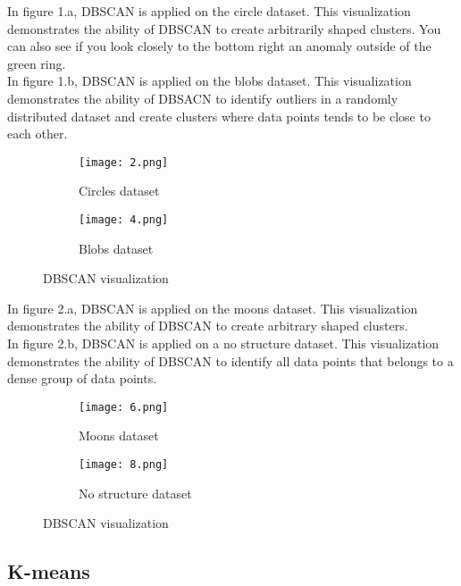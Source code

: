 \documentclass[a4paper]{article}
\begin{document}
In figure 1.a, DBSCAN is applied on the circle dataset. This visualization demonstrates the ability of DBSCAN to create arbitrarily shaped clusters. You can also see if you look closely to the bottom right an anomaly outside of the green ring.
\newline\\
In figure 1.b, DBSCAN is applied on the blobs dataset. This visualization demonstrates the ability of DBSACN to identify outliers in a randomly distributed dataset and create clusters where data points tends to be close to each other. 


\begin{figure}[H]
\begin{subfigure}[h]{0.5\linewidth}
\texttt{[image: 2.png]}
\caption{Circles dataset}
\end{subfigure}
\hfill
\begin{subfigure}[h]{0.5\linewidth}
\texttt{[image: 4.png]}
\caption{Blobs dataset}
\end{subfigure}%
\caption{DBSCAN visualization}
\end{figure}
\newpage
In figure 2.a, DBSCAN is applied on the moons dataset. This visualization demonstrates the ability of DBSCAN to create arbitrary shaped clusters.\newline\\
In figure 2.b, DBSCAN is applied on a no structure dataset. This visualization demonstrates the ability of DBSCAN to identify all data points that belongs to a dense group of data points.

\begin{figure}[H]
\begin{subfigure}[h]{0.5\linewidth}
\texttt{[image: 6.png]}
\caption{Moons dataset}
\end{subfigure}
\hfill
\begin{subfigure}[h]{0.5\linewidth}
\texttt{[image: 8.png]}
\caption{No structure dataset}
\end{subfigure}%
\caption{DBSCAN visualization}
\end{figure}

\newpage


\subsection{K-means}
\end{document}
